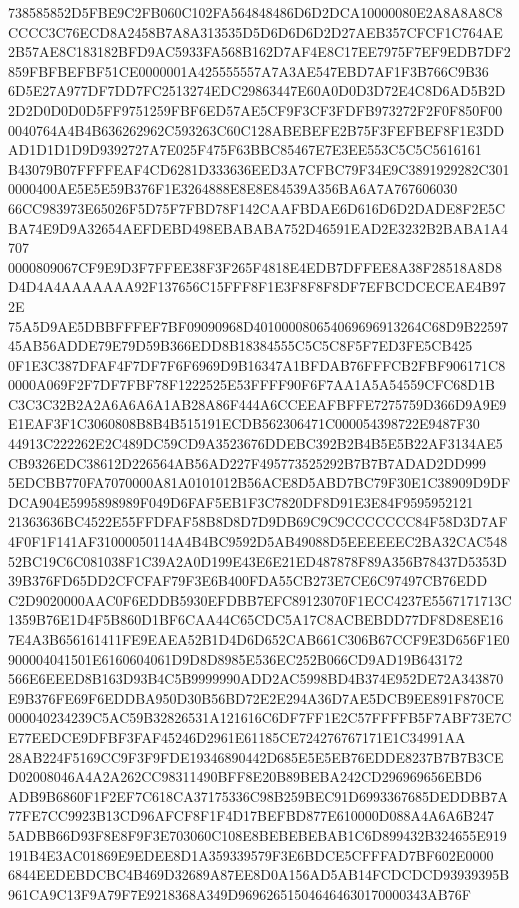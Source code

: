 \documentclass[UTF8,fontset=fandol,zihao=-4,a4paper]{ctexart}
\begin{document}
{{738585852D5FBE9C2FB060C102FA564848486D6D2DCA10000080E2A8A8A8C8CCCC3C76ECD8A2458B7A8A313535D5D6D6D6D2D27AEB357CFCF1C764AE
2B57AE8C183182BFD9AC5933FA568B162D7AF4E8C17EE7975F7EF9EDB7DF2859FBFBEFBF51CE0000001A425555557A7A3AE547EBD7AF1F3B766C9B36
6D5E27A977DF7DD7FC2513274EDC29863447E60A0D0D3D72E4C8D6AD5B2D2D2D0D0D0D5FF9751259FBF6ED57AE5CF9F3CF3FDFB973272F2F0F850F00
0040764A4B4B636262962C593263C60C128ABEBEFE2B75F3FEFBEF8F1E3DDAD1D1D1D9D9392727A7E025F475F63BBC85467E7E3EE553C5C5C5616161
B43079B07FFFFEAF4CD6281D333636EED3A7CFBC79F34E9C3891929282C3010000400AE5E5E59B376F1E3264888E8E8E84539A356BA6A7A767606030
66CC983973E65026F5D75F7FBD78F142CAAFBDAE6D616D6D2DADE8F2E5CBA74E9D9A32654AEFDEBD498EBABABA752D46591EAD2E3232B2BABA1A4707
0000809067CF9E9D3F7FFEE38F3F265F4818E4EDB7DFFEE8A38F28518A8D8D4D4A4AAAAAAA92F137656C15FFF8F1E3F8F8F8DF7EFBCDCECEAE4B972E
75A5D9AE5DBBFFFEF7BF09090968D401000080654069696913264C68D9B2259745AB56ADDE79E79D59B366EDD8B18384555C5C5C8F5F7ED3FE5CB425
0F1E3C387DFAF4F7DF7F6F6969D9B16347A1BFDAB76FFFCB2FBF906171C80000A069F2F7DF7FBF78F1222525E53FFFF90F6F7AA1A5A54559CFC68D1B
C3C3C32B2A2A6A6A6A1AB28A86F444A6CCEEAFBFFE7275759D366D9A9E9E1EAF3F1C3060808B8B4B515191ECDB562306471C000054398722E9487F30
44913C222262E2C489DC59CD9A3523676DDEBC392B2B4B5E5B22AF3134AE5CB9326EDC38612D226564AB56AD227F495773525292B7B7B7ADAD2DD999
5EDCBB770FA7070000A81A0101012B56ACE8D5ABD7BC79F30E1C38909D9DFDCA904E5995898989F049D6FAF5EB1F3C7820DF8D91E3E84F9595952121
21363636BC4522E55FFDFAF58B8D8D7D9DB69C9C9CCCCCCC84F58D3D7AF4F0F1F141AF31000050114A4B4BC9592D5AB49088D5EEEEEEC2BA32CAC548
52BC19C6C081038F1C39A2A0D199E43E6E21ED487878F89A356B78437D5353D39B376FD65DD2CFCFAF79F3E6B400FDA55CB273E7CE6C97497CB76EDD
C2D9020000AAC0F6EDDB5930EFDBB7EFC89123070F1ECC4237E5567171713C1359B76E1D4F5B860D1BF6CAA44C65CDC5A17C8ACBEBDD77DF8D8E8E16
7E4A3B656161411FE9EAEA52B1D4D6D652CAB661C306B67CCF9E3D656F1E0900004041501E6160604061D9D8D8985E536EC252B066CD9AD19B643172
566E6EEED8B163D93B4C5B9999990ADD2AC5998BD4B374E952DE72A343870E9B376FE69F6EDDBA950D30B56BD72E2E294A36D7AE5DCB9EE891F870CE
000040234239C5AC59B32826531A121616C6DF7FF1E2C57FFFFB5F7ABF73E7CE77EEDCE9DFBF3FAF45246D2961E61185CE724276767171E1C34991AA
28AB224F5169CC9F3F9FDE19346890442D685E5E5EB76EDDE8237B7B7B3CED02008046A4A2A262CC98311490BFF8E20B89BEBA242CD296969656EBD6
ADB9B6860F1F2EF7C618CA37175336C98B259BEC91D6993367685DEDDBB7A77FE7CC9923B13CD96AFCF8F1F4D17BEFBD877E610000D088A4A6A6B247
5ADBB66D93F8E8F9F3E703060C108E8BEBEBEBAB1C6D899432B324655E919191B4E3AC01869E9EDEE8D1A359339579F3E6BDCE5CFFFAD7BF602E0000
6844EEDEBDCBC4B469D32689A87EE8D0A156AD5AB14FCDCDCD93939395B961CA9C13F9A79F7E9218368A349D969626515046464630170000343AB76F
}}
\end{document}
